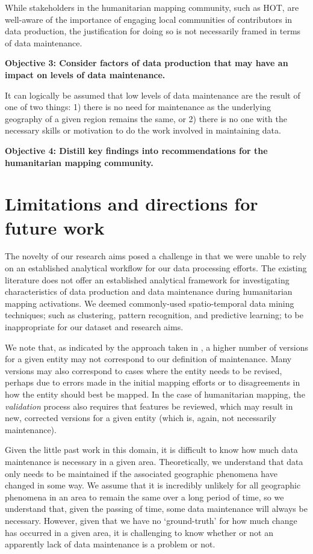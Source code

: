 While stakeholders in the humanitarian mapping community, such as HOT, are well-aware of the importance of engaging local communities of contributors in data production, the justification for doing so is not necessarily framed in terms of data maintenance. 

\noindent\textbf{Objective 3: Consider factors of data production that may have an impact on levels of data maintenance.}

It can logically be assumed that low levels of data maintenance are the result of one of two things: 1) there is no need for maintenance as the underlying geography of a given region remains the same, or 2) there is no one with the necessary skills or motivation to do the work involved in maintaining data. 

\noindent\textbf{Objective 4: Distill key findings into recommendations for the humanitarian mapping community.}

\section{Limitations and directions for future work}

The novelty of our research aims posed a challenge in that we were unable to rely on an established analytical workflow for our data processing efforts. The existing literature does not offer an established analytical framework for investigating characteristics of data production and data maintenance during humanitarian mapping activations. We deemed commonly-used spatio-temporal data mining techniques; such as clustering, pattern recognition, and predictive learning; to be inappropriate for our dataset and research aims. 

We note that, as indicated by the approach taken in \textcite{mooney_characteristics_2012}, a higher number of versions for a given entity may not correspond to our definition of maintenance. Many versions may also correspond to cases where the entity needs to be revised, perhaps due to errors made in the initial mapping efforts or to disagreements in how the entity should best be mapped. In the case of humanitarian mapping, the \textit{validation} process also requires that features be reviewed, which may result in new, corrected versions for a given entity (which is, again, not necessarily maintenance). 

Given the little past work in this domain, it is difficult to know how much data maintenance is necessary in a given area. Theoretically, we understand that data only needs to be maintained if the associated geographic phenomena have changed in some way. We assume that it is incredibly unlikely for all geographic phenomena in an area to remain the same over a long period of time, so we understand that, given the passing of time, some data maintenance will always be necessary. However, given that we have no ‘ground-truth’ for how much change has occurred in a given area, it is challenging to know whether or not an apparently lack of data maintenance is a problem or not.  

